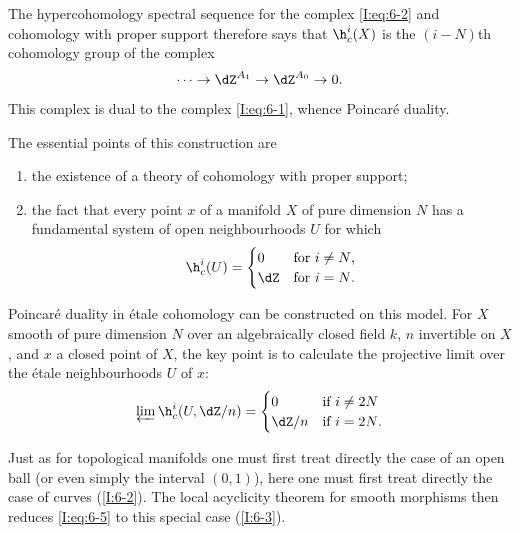 \documentclass[oneside]{book}
\begin{document}
The hypercohomology spectral sequence for the complex
\eqref{I:eq:6-2} and cohomology with proper support therefore says that
$\h_c^i(X)$ is the $(i-N)$th cohomology group of the complex
\begin{equation}\label{I:eq:6-3}
  \cdots \to \dZ^{A_1} \to \dZ^{A_0} \to 0 \text{.}
\end{equation}
This complex is dual to the complex \eqref{I:eq:6-1}, whence Poincaré
duality.

The essential points of this construction are
\begin{enumerate}[\indent a)]
  \item the existence of a theory of cohomology with proper support;
  \item the fact that every point $x$ of a manifold $X$ of pure dimension
    $N$ has a fundamental system of open neighbourhoods $U$ for which
    \begin{equation}\label{I:eq:6-4}
      \h_c^i(U) = \begin{cases}
                    0   & \text{for $i\ne N$,} \\
                    \dZ & \text{for $i=N$.}
                  \end{cases}
    \end{equation}
\end{enumerate}

Poincaré duality in étale cohomology can be constructed on this model.
For $X$ smooth of pure dimension $N$ over an algebraically closed field
$k$, $n$ invertible on $X$, and $x$ a closed point of $X$, the key
point is to calculate the projective limit over the étale neighbourhoods
$U$ of $x$:
\begin{equation}\label{I:eq:6-5}
  \varprojlim \h_c^i(U,\dZ/n)
    = \begin{cases}
        0     & \text{if $i\ne 2N$} \\
        \dZ/n & \text{if $i=2N$.}
      \end{cases}
\end{equation}

Just as for topological manifolds one must first treat directly the case
of an open ball (or even simply the interval $(0,1)$), here one must
first treat directly the case of curves (\ref{I:6-2}). The local
acyclicity theorem for smooth morphisms then reduces
\eqref{I:eq:6-5} to this special case (\ref{I:6-3}).
\end{document}

